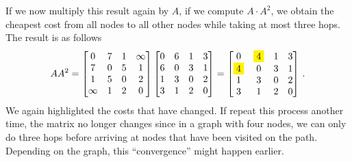 If we now multiply this result again by $A$, \ie if we compute
$A \cdot A^2$, we obtain the cheapest cost from all nodes to all other
nodes while taking at most three hops. The result is as follows
\begin{equation*}
  AA^2 =
  \begin{bmatrix}    
    0 & 7 & 1 & \infty \\
    7 & 0 & 5 & 1 \\
    1 & 5 & 0 & 2 \\
    \infty & 1 & 2 & 0
  \end{bmatrix}
  \begin{bmatrix}    
    0 & {6} & 1 & {3} \\
    {6} & 0 & {3} & 1 \\
    1 & {3} & 0 & 2 \\
    {3} & 1 & 2 & 0
  \end{bmatrix}
  =
  \begin{bmatrix}    
    0 & \colorbox{yellow}{4} & 1 & {3} \\
    \colorbox{yellow}{4} & 0 & {3} & 1 \\
    1 & {3} & 0 & 2 \\
    {3} & 1 & 2 & 0
  \end{bmatrix}\,.
\end{equation*}
We again highlighted the costs that have changed. If repeat this
process another time, the matrix no longer changes since in a graph
with four nodes, we can only do three hops before arriving at nodes
that have been visited on the path. Depending on the graph, this
``convergence'' might happen earlier.

